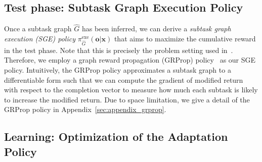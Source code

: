 \documentclass{article} \usepackage{iclr2020_conference,times}
\newcommand{\mb}{\mathbf}
\begin{document}
\subsection{Test phase: Subtask Graph Execution Policy}
\label{sec:method_test_phase}

Once a subtask graph $\widehat{G}$ has been inferred, we can derive a \emph{subtask graph execution \textrm{(SGE)} policy}
$\pi^\text{exe}_{\widehat{G}} (\mb{o} | \mb{x})$
that aims to maximize the cumulative reward in the test phase.
Note that this is precisely the problem setting used in~\citet{sohn2018hierarchical}.
Therefore, we employ a graph reward propagation (GRProp) policy~\citep{sohn2018hierarchical}
as our SGE policy. Intuitively, the GRProp policy approximates a subtask graph to a differentiable form
such that we can compute the gradient of modified return with respect to the completion vector to measure how much each subtask is likely to increase the modified return.
Due to space limitation, we give a detail of the GRProp policy in Appendix~\ref{sec:appendix_grprop}.





\subsection{Learning: Optimization of the Adaptation Policy}\label{sec:opt}
\end{document}
